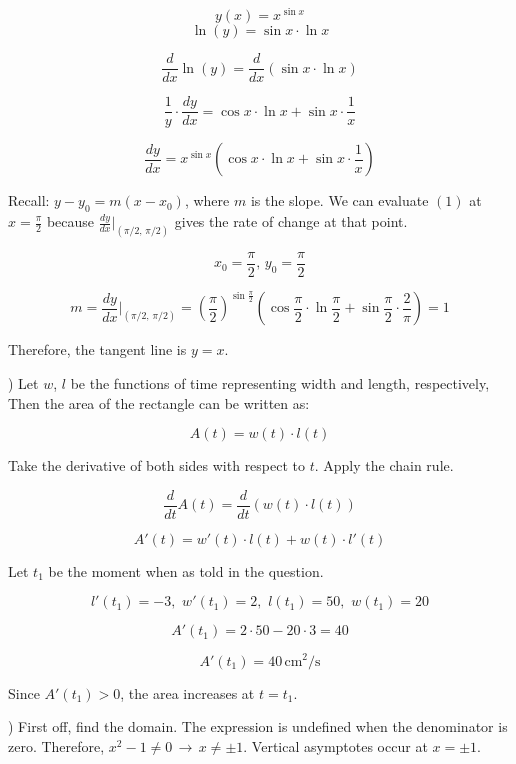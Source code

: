\documentclass{article}
\begin{document}
\[y(x) = x^{\sin x}\]
\[\ln(y) = \sin x \cdot \ln x\]

\[\frac{d}{dx}\ln(y) = \frac{d}{dx}(\sin x \cdot \ln x)\]

\[\frac{1}{y} \cdot \frac{dy}{dx} =  \cos x \cdot \ln x +  \sin x \cdot \frac{1}{x}\]

\begin{equation} \frac{dy}{dx} = x^{\sin x}\left(\cos x \cdot \ln x +  \sin x \cdot \frac{1}{x}\right)\end{equation}

\hfill

\noindent Recall: $y-y_0 = m(x-x_0)$, where $m$ is the slope. We can evaluate $(1)$ at $x = \frac{\pi}{2}$ because $\frac{dy}{dx}|_{(\pi/2,\, \pi/2)}$ gives the rate of change at that point.

\[x_0 = \frac{\pi}{2},\,y_0 = \frac{\pi}{2}\]

\[m = \frac{dy}{dx}\Bigg|_{(\pi/2,\, \pi/2)} = \left(\frac{\pi}{2}\right)^{\sin \frac{\pi}{2}}\left(\cos\frac{\pi}{2} \cdot \ln \frac{\pi}{2} + \sin \frac{\pi}{2} \cdot \frac{2}{\pi}\right) = 1\]

\hfill

\noindent Therefore, the tangent line is $\boxed{y=x}$.

\hfill

) Let $w$, $l$ be the functions of time representing width and length, respectively, Then the area of the rectangle can be written as:

\[A(t) = w(t)\cdot l(t)\]

\hfill

\noindent Take the derivative of both sides with respect to $t$. Apply the chain rule.

\[\frac{d}{dt}A(t) = \frac{d}{dt}(w(t)\cdot l(t))\]

\[A'(t) = w'(t)\cdot l(t) + w(t)\cdot l'(t)\]

\hfill

\noindent Let $t_1$ be the moment when as told in the question.

\[l'(t_1) = -3,\,\,w'(t_1) = 2,\,\,l(t_1) = 50,\,\, w(t_1) = 20\]

\[A'(t_1) = 2\cdot 50 - 20\cdot 3 = 40\]

\[\boxed{A'(t_1) = 40\, \text{cm}^2/\text{s}}\]

\hfill

\noindent Since $A'(t_1) > 0$, the area increases at $t=t_1$.

\hfill

) First off, find the domain. The expression is undefined when the denominator is zero. Therefore, $x^2-1 \neq 0 \,\rightarrow\, x\neq \pm 1$. Vertical asymptotes occur at $x = \pm 1$.
\end{document}
